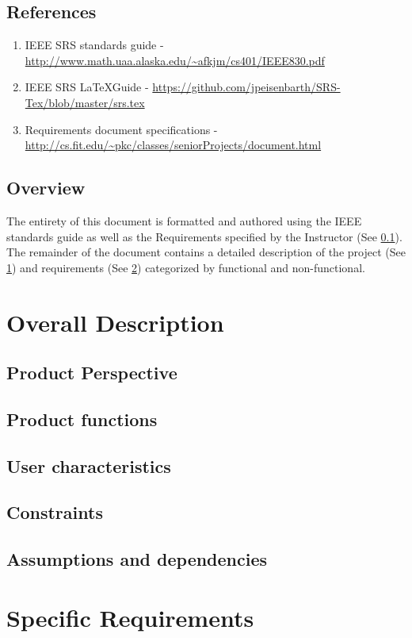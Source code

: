 \documentclass[12pt]{article}
\begin{document}
	\subsection{References} \label{refs}
		\begin{enumerate}
		\item IEEE SRS standards guide -  \url{http://www.math.uaa.alaska.edu/~afkjm/cs401/IEEE830.pdf}
		\item IEEE SRS \LaTeX Guide - \url{https://github.com/jpeisenbarth/SRS-Tex/blob/master/srs.tex}
		\item Requirements document specifications - \url{http://cs.fit.edu/~pkc/classes/seniorProjects/document.html}
	\end{enumerate}
	\subsection{Overview} \label{overview}
	The entirety of this document is formatted and authored using the IEEE standards guide as well as the Requirements specified by the Instructor (See \ref{refs}). The remainder of the document contains a detailed description of the project (See \ref{desc}) and requirements (See \ref{reqs}) categorized by functional and non-functional. 
	\section{Overall Description} \label{desc}
	\subsection{Product Perspective}
	\subsection{Product functions}
	\subsection{User characteristics}
	\subsection{Constraints}
	\subsection{Assumptions and dependencies}
	\section{Specific Requirements} \label{reqs}
	
	
\end{document}
